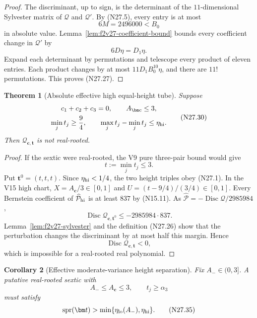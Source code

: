 \documentclass[11pt]{article}
\newtheorem{theorem}{Theorem}[section]
\newtheorem{corollary}[theorem]{Corollary}
\theoremstyle{definition}
\theoremstyle{remark}
\begin{document}
\begin{proof}
The discriminant, up to sign, is the determinant of the
\(11\)-dimensional Sylvester matrix of \(\mathcal Q\) and
\(\mathcal Q'\).  By \textup{(N27.5)}, every entry is at most
\[
 6M=2496000<B_0
 \tag{N27.28}
\]
in absolute value.  Lemma~\ref{lem:f2v27-coefficient-bound} bounds every
coefficient change in \(\mathcal Q'\) by
\[
 6D\eta=D_1\eta.
 \tag{N27.29}
\]
Expand each determinant by permutations and telescope every product of
eleven entries.  Each product changes by at most
\(11D_1B_0^{10}\eta\), and there are \(11!\) permutations.  This proves
\textup{(N27.27)}.
\end{proof}

\begin{theorem}[Absolute effective high equal-height tube]
\label{thm:f2v27-high-tube}
Suppose
\[
\begin{gathered}
 c_1+c_2+c_3=0,\qquad A_{\bm c}\leq3,\\
 \min_jt_j\geq\frac94,\qquad
 \max_jt_j-\min_jt_j\leq\eta_{\rm hi}.
\end{gathered}
\tag{N27.30}
\]
Then \(\mathcal Q_{\bm c,\bm t}\) is not real-rooted.
\end{theorem}

\begin{proof}
If the sextic were real-rooted, the V9 pure three-pair bound would give
\[
 t:=\min_jt_j\leq3.
 \tag{N27.31}
\]
Put \(\bm t^0=(t,t,t)\).  Since \(\eta_{\rm hi}<1/4\), the two height
triples obey \textup{(N27.1)}.  In the V15 high chart,
\(X=A_{\bm c}/3\in[0,1]\) and
\(U=(t-9/4)/(3/4)\in[0,1]\).  Every Bernstein coefficient of
\(\widehat{\mathcal P}_{\rm hi}\) is at least \(837\) by
\textup{(N15.11)}.  As
\(\widehat{\mathcal P}=-\operatorname{Disc}\mathcal Q/2985984\),
\[
 \operatorname{Disc}\mathcal Q_{\bm c,\bm t^0}
 \leq-2985984\cdot837.
 \tag{N27.32}
\]
Lemma~\ref{lem:f2v27-sylvester} and the definition
\textup{(N27.26)} show that the perturbation changes the discriminant by
at most half this margin.  Hence
\[
 \operatorname{Disc}\mathcal Q_{\bm c,\bm t}<0,
 \tag{N27.33}
\]
which is impossible for a real-rooted real polynomial.
\end{proof}

\begin{corollary}[Effective moderate-variance height separation]
\label{cor:f2v27-effective-core}
Fix \(A_-\in(0,3]\).  A putative real-rooted sextic with
\[
 A_-\leq A_{\bm c}\leq3,\qquad t_j\geq\alpha_3
 \tag{N27.34}
\]
must satisfy
\[
 \operatorname{spr}(\bm t)>
 \min\{\eta_{\rm lo}(A_-),\eta_{\rm hi}\}.
 \tag{N27.35}
\]
\end{corollary}
\end{document}
